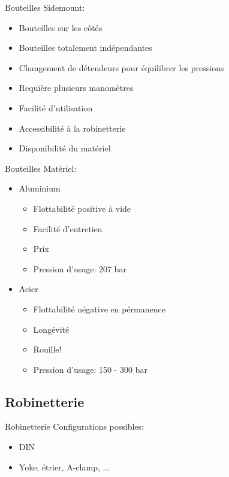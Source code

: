 \begin{frame}{Bouteilles}  
	Sidemount:
	\begin{itemize}
		\item Bouteilles sur les côtés
		\item Bouteilles totalement indépendantes
		\item Changement de détendeurs pour équilibrer les pressions
		\item Requière plusieurs manomètres
		\item Facilité d'utilisation
		\item Accessibilité à la robinetterie
		\item Disponibilité du matériel
	\end{itemize}
\end{frame}

\begin{frame}{Bouteilles}  
	Matériel:
	\begin{itemize}
			\item Aluminium
			\begin{itemize}
				\item Flottabilité positive à vide
				\item Facilité d'entretien
				\item Prix
				\item Pression d'usage: 207 bar
			\end{itemize}
			\item Acier
			\begin{itemize}
				\item Flottabilité négative en pérmanence
				\item Longévité
				\item Rouille!
				\item Pression d'usage: 150 - 300 bar
			\end{itemize}
		\end{itemize}	
\end{frame}

\subsection{Robinetterie}

\begin{frame}{Robinetterie}  
	Configurations possibles:
	\begin{itemize}
		\item DIN
		\item Yoke, étrier, A-clamp, ...
	\end{itemize}
\end{frame}

